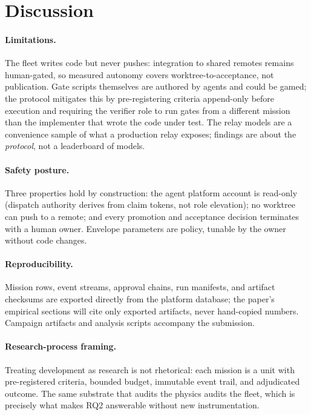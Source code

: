 \section{Discussion}\label{sec:discussion}

\paragraph{Limitations.}
The fleet writes code but never pushes: integration to shared remotes
remains human-gated, so measured autonomy covers worktree-to-acceptance,
not publication. Gate scripts themselves are authored by agents and
could be gamed; the protocol mitigates this by pre-registering criteria
append-only before execution and requiring the verifier role to run
gates from a different mission than the implementer that wrote the
code under test. The relay models are a convenience sample of what a
production relay exposes; findings are about the \emph{protocol}, not a
leaderboard of models.

\paragraph{Safety posture.}
Three properties hold by construction: the agent platform account is
read-only (dispatch authority derives from claim tokens, not role
elevation); no worktree can push to a remote; and every promotion and
acceptance decision terminates with a human owner. Envelope parameters
are policy, tunable by the owner without code changes.

\paragraph{Reproducibility.}
Mission rows, event streams, approval chains, run manifests, and
artifact checksums are exported directly from the platform database;
the paper's empirical sections will cite only exported artifacts,
never hand-copied numbers. Campaign artifacts and analysis scripts
accompany the submission.

\paragraph{Research-process framing.}
Treating development as research is not rhetorical: each mission is a
unit with pre-registered criteria, bounded budget, immutable event
trail, and adjudicated outcome. The same substrate that audits the
physics audits the fleet, which is precisely what makes RQ2 answerable
without new instrumentation.
